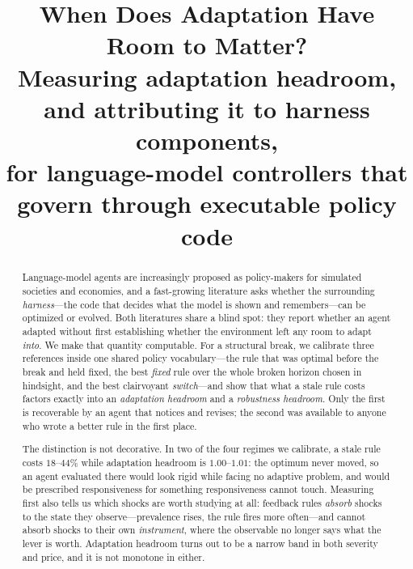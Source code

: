 \documentclass[11pt]{article}
\title{\bfseries When Does Adaptation Have Room to Matter?\\
\large Measuring adaptation headroom, and attributing it to harness components,\\
for language-model controllers that govern through executable policy code}
\author{}
\date{}
\begin{document}
\maketitle

\begin{abstract}
\noindent
Language-model agents are increasingly proposed as policy-makers for simulated societies and
economies, and a fast-growing literature asks whether the surrounding \emph{harness}---the code that
decides what the model is shown and remembers---can be optimized or evolved. Both literatures share
a blind spot: they report whether an agent adapted without first establishing whether the
environment left any room to adapt \emph{into}. We make that quantity computable. For a structural
break, we calibrate three references inside one shared policy vocabulary---the rule that was optimal
before the break and held fixed, the best \emph{fixed} rule over the whole broken horizon chosen in
hindsight, and the best clairvoyant \emph{switch}---and show that what a stale rule costs factors
exactly into an \emph{adaptation headroom} and a \emph{robustness headroom}. Only the first is
recoverable by an agent that notices and revises; the second was available to anyone who wrote a
better rule in the first place.

The distinction is not decorative. In two of the four regimes we calibrate, a stale rule costs
$18$--$44\%$ while adaptation headroom is $1.00$--$1.01$: the optimum never moved, so an agent
evaluated there would look rigid while facing no adaptive problem, and would be prescribed
responsiveness for something responsiveness cannot touch. Measuring first also tells us which shocks
are worth studying at all: feedback rules \emph{absorb} shocks to the state they observe---prevalence
rises, the rule fires more often---and cannot absorb shocks to their own \emph{instrument}, where the
observable no longer says what the lever is worth. Adaptation headroom turns out to be a narrow band
in both severity and price, and it is not monotone in either.


\end{abstract}
\end{document}
